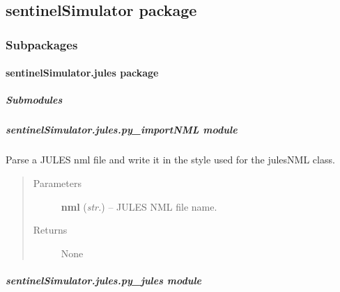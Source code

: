 \documentclass[letterpaper,10pt,english]{sphinxmanual}
\begin{document}
\subsection{sentinelSimulator package}
\label{source/sentinelSimulator:sentinelsimulator-package}\label{source/sentinelSimulator::doc}

\subsubsection{Subpackages}
\label{source/sentinelSimulator:subpackages}

\paragraph{sentinelSimulator.jules package}
\label{source/sentinelSimulator.jules:sentinelsimulator-jules-package}\label{source/sentinelSimulator.jules::doc}

\subparagraph{Submodules}
\label{source/sentinelSimulator.jules:submodules}

\subparagraph{sentinelSimulator.jules.py\_importNML module}
\label{source/sentinelSimulator.jules:sentinelsimulator-jules-py-importnml-module}\label{source/sentinelSimulator.jules:module-sentinelSimulator.jules.py_importNML}

\begin{fulllineitems}
\label{source/sentinelSimulator.jules:sentinelSimulator.jules.py_importNML.importJulesNML}
Parse a JULES nml file and write it in the style used for the
julesNML class.
\begin{quote}\begin{description}
\item[{Parameters}] \leavevmode
\textbf{nml} (\emph{str.}) -- JULES NML file name.

\item[{Returns}] \leavevmode
None

\end{description}\end{quote}

\end{fulllineitems}



\subparagraph{sentinelSimulator.jules.py\_jules module}
\label{source/sentinelSimulator.jules:sentinelsimulator-jules-py-jules-module}\label{source/sentinelSimulator.jules:module-sentinelSimulator.jules.py_jules}
\end{document}
